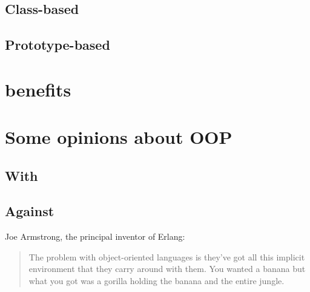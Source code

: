 \documentclass[12pt]{book}
\begin{document}
\subsection{Class-based}

\subsection{Prototype-based}

\section{benefits}


	
\section{Some opinions about OOP}

\subsection{With}

\subsection{Against}

Joe Armstrong, the principal inventor of Erlang:
\begin{quote}
The problem with object-oriented languages is they've got all this implicit environment that they carry around with them. 
You wanted a banana but what you got was a gorilla holding the banana and the entire jungle.
\end{quote}


\ifx\wholebook\relax\else
% 
% 
	
\end{document}
